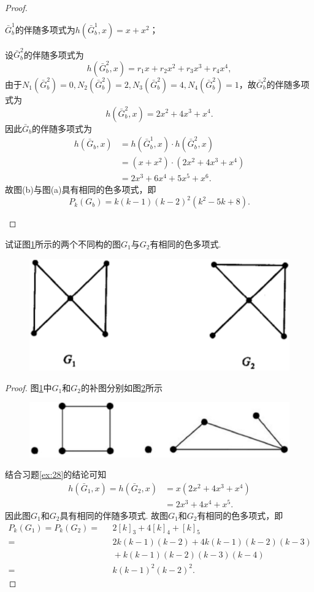 \documentclass[cn,blue,normal,founder,11pt]{elegantnote}
\begin{document}
\begin{proof}
\begin{enumerate}[(a)]
		\(\bar{G}_b^1\)的伴随多项式为\(h(\bar{G}_b^1,x)=x+x^2\)；

		设\(\bar{G}_b^2\)的伴随多项式为
		\[h(\bar{G}_b^2,x)=r_1x+r_2x^2+r_3x^3+r_4x^4,\]
		由于\(N_1(\bar{G}_b^2)=0,N_2(\bar{G}_b^2)=2,N_3(\bar{G}_b^2)=4,N_4(\bar{G}_b^2)=1\)，故\(\bar{G}_b^2\)的伴随多项式为
		\[h(\bar{G}_b^2,x)=2x^2+4x^3+x^4.\]
		因此\(\bar{G}_b\)的伴随多项式为
		\begin{align*}
			h(\bar{G}_b,x)&=h(\bar{G}_b^1,x)\cdot h(\bar{G}_b^2,x)\\
			&=(x+x^2)\cdot(2x^2+4x^3+x^4)\\
			&=2x^3+6x^4+5x^5+x^6.
		\end{align*}
		故图(b)与图(a)具有相同的色多项式，即
		\[P_k(G_b)=k(k-1)(k-2)^2(k^2-5k+8).\]
	\end{enumerate}
\end{proof}

\begin{example}
	试证图\ref{fig:7.32}所示的两个不同构的图\(G_1\)与\(G_2\)有相同的色多项式.
	\begin{figure}[H]
		\centering
		\includegraphics[scale=0.55]{image/ex7.32.pdf}
		\caption{}
		\label{fig:7.32}
	\end{figure}
\end{example}

\begin{proof}
	图\ref{fig:7.32}中\(G_1\)和\(G_2\)的补图分别如图\ref{fig:7.32_bt}所示
	\begin{figure}[H]
		\centering
		\includegraphics[scale=0.25]{image/ex7.32_bt.pdf}
		\caption{}
		\label{fig:7.32_bt}
	\end{figure}
	结合习题\ref{ex:28}的结论可知
	\begin{align*}
		h(\bar{G}_1,x)=h(\bar{G}_2,x)&=x(2x^2+4x^3+x^4)\\
		&=2x^3+4x^4+x^5.
	\end{align*}
	因此图\(G_1\)和\(G_2\)具有相同的伴随多项式. 故图\(G_1\)和\(G_2\)有相同的色多项式，即
	\begin{align*}
		P_k(G_1)=P_k(G_2)=&\text{ }2[k]_3+4[k]_4+[k]_5\\
		=&\text{ }2k(k-1)(k-2)+4k(k-1)(k-2)(k-3)\\
		&\text{ }+k(k-1)(k-2)(k-3)(k-4)\\
		=&\text{ }k(k-1)^2(k-2)^2.
	\end{align*}
\end{proof}
\end{document}
